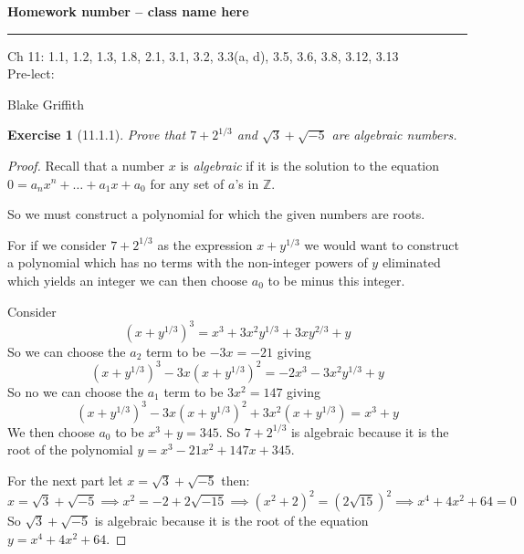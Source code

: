 \documentclass[12pt]{article}
\newtheorem*{exer}{Exercise}
\begin{document}
\textbf{Homework number -- class name here} \\

\hrule

\begin{minipage}{.80\linewidth}
    \flushleft
    Ch 11: 1.1, 1.2, 1.3, 1.8, 2.1, 3.1, 3.2, 3.3(a, d), 3.5, 3.6, 3.8,
    3.12, 3.13 \\
    Pre-lect:  \\
\end{minipage}
\begin{minipage}{.20\linewidth}
    \flushright
    Blake Griffith
\end{minipage}


\begin{exer}[11.1.1]

    Prove that $7 + 2^{1/3}$ and $\sqrt{3} + \sqrt{-5}$ are algebraic
    numbers.

\end{exer}

\begin{proof}

    Recall that a number $x$ is \textit{algebraic} if it is the solution
    to the equation $0 = a_n x^n + \dots + a_1 x + a_0$ for any set of
    $a$'s in $\mathbb{Z}$.

    So we must construct a polynomial for which the given numbers are
    roots. 

    For if we consider $7 + 2^{1/3}$ as the expression $x + y^{1/3}$ we
    would want to construct a polynomial which has no terms with the
    non-integer powers of $y$ eliminated which yields an integer we can
    then choose $a_0$ to be minus this integer.

    Consider 
    \[
        (x + y^{1/3})^3 = x^3 + 3x^2y^{1/3} + 3xy^{2/3} + y
    \]
    So we can choose the $a_2$ term to be $-3x = -21$ giving
    \[
        (x + y^{1/3})^3 - 3x(x + y^{1/3})^2 = -2x^3 - 3x^2y^{1/3} + y
    \]
    So no we can choose the $a_1$ term to be $3x^2 = 147$ giving
    \[
        (x + y^{1/3})^3 - 3x(x + y^{1/3})^2 + 3x^2(x + y^{1/3}) = x^3 +
        y
    \]
    We then choose $a_0$ to be $x^3 + y = 345$. So $7 + 2^{1/3}$ is
    algebraic because it is the root of the polynomial $y = x^3 - 21x^2
    + 147x + 345$.

    For the next part let $x = \sqrt{3} + \sqrt{-5}$ then:
    \[
        x = \sqrt{3} + \sqrt{-5} \implies x^2 = -2 + 2\sqrt{-15}
        \implies (x^2 + 2)^2 = (2\sqrt{15})^2 \implies x^4 + 4x^2 + 64 =
        0
    \]
    So $\sqrt{3} + \sqrt{-5}$ is algebraic because it is the root of the
    equation $y = x^4 + 4x^2 + 64$.

\end{proof}
\end{document}
